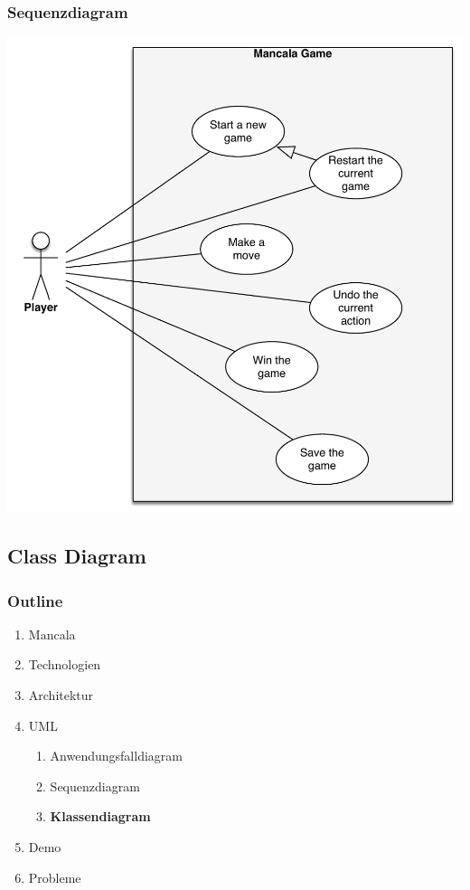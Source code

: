 \documentclass[
	10pt,
	t		%
]{beamer}
\begin{document}
\begin{frame}
\frametitle{Sequenzdiagram}
\begin{center}
\includegraphics[scale=0.32]{./../Diagrams/SequenzDiagram.pdf}
\end{center}
\end{frame}

\subsection{Class Diagram}
\begin{frame}
\frametitle{Outline}
\begin{enumerate}
\item Mancala
\item Technologien
\item Architektur
\item UML
\begin{enumerate}
\item Anwendungsfalldiagram
\item Sequenzdiagram
\item \textbf{Klassendiagram}
\end{enumerate}
\item Demo
\item Probleme
\end{enumerate}
\end{frame}
\end{document}
